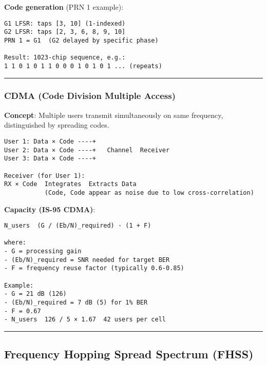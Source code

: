 \textbf{Code generation} (PRN 1 example):

\begin{verbatim}
G1 LFSR: taps [3, 10] (1-indexed)
G2 LFSR: taps [2, 3, 6, 8, 9, 10]
PRN 1 = G1  (G2 delayed by specific phase)

Result: 1023-chip sequence, e.g.:
1 1 0 1 0 1 1 0 0 0 1 0 1 0 1 ... (repeats)
\end{verbatim}

\begin{center}\rule{0.5\linewidth}{0.5pt}\end{center}

\subsubsection{CDMA (Code Division Multiple
Access)}\label{cdma-code-division-multiple-access}

\textbf{Concept}: Multiple users transmit simultaneously on same
frequency, distinguished by spreading codes.

\begin{verbatim}
User 1: Data × Code ----+
User 2: Data × Code ----+   Channel  Receiver
User 3: Data × Code ----+

Receiver (for User 1):
RX × Code  Integrates  Extracts Data
           (Code, Code appear as noise due to low cross-correlation)
\end{verbatim}

\textbf{Capacity (IS-95 CDMA)}:

\begin{verbatim}
N_users  (G / (Eb/N)_required) · (1 + F)

where:
- G = processing gain
- (Eb/N)_required = SNR needed for target BER
- F = frequency reuse factor (typically 0.6-0.85)

Example:
- G = 21 dB (126)
- (Eb/N)_required = 7 dB (5) for 1% BER
- F = 0.67
- N_users  126 / 5 × 1.67  42 users per cell
\end{verbatim}

\begin{center}\rule{0.5\linewidth}{0.5pt}\end{center}

\subsection{\texorpdfstring{ Frequency Hopping Spread Spectrum
(FHSS)}{ Frequency Hopping Spread Spectrum (FHSS)}}\label{frequency-hopping-spread-spectrum-fhss}

